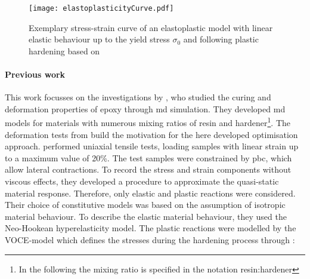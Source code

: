 \begin{figure}[H]
    \centering
    \texttt{[image: elastoplasticityCurve.pdf]}
    \caption{Exemplary stress-strain curve of an elastoplastic model with linear elastic behaviour up to the yield stress $\sigma_0$ and following plastic hardening based on \cite{mergheim_lecture_nodate}}
    \label{fig:elastoplasticityCurve}
\end{figure}




\paragraph{Previous work}
This work focusses on the investigations by \citet{ries_deciphering_nodate}, who studied the curing and deformation properties of epoxy through \acrshort{md} simulation. They developed \acrshort{md} models for materials with numerous mixing ratios of resin and hardener\footnote{In the following the mixing ratio is specified in the notation resin:hardener}. The deformation tests from \citet{ries_deciphering_nodate} build the motivation for the here developed optimisation approach. \citet{ries_deciphering_nodate} performed uniaxial tensile tests, loading samples with linear strain up to a maximum value of 20\%. The test samples were constrained by \acrshort{pbc}, which allow lateral contractions. To record the stress and strain components without viscous effects, they developed a procedure to approximate the quasi-static material response. Therefore, only elastic and plastic reactions were considered. Their choice of constitutive models was based on the assumption of isotropic material behaviour. To describe the elastic material behaviour, they used the Neo-Hookean hyperelasticity model. The plastic reactions were modelled by the VOCE-model which defines the stresses during the hardening process through \cite{voce_practical_1948}:



